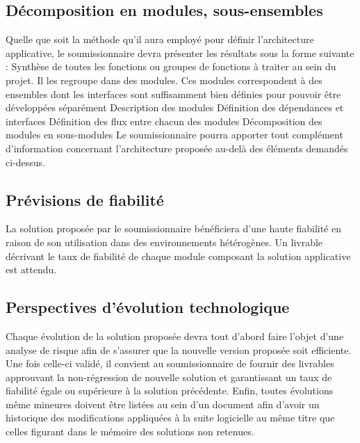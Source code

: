 \documentclass[11pt,fleqn]{book} %
\begin{document}
\subsection{Décomposition en modules, sous-ensembles}
Quelle que soit la méthode qu'il aura employé pour définir l'architecture applicative, le 
soumissionnaire devra présenter les résultats sous la forme suivante : 
Synthèse de toutes les fonctions ou groupes de fonctions à traiter au sein du projet. Il les regroupe dans des modules. Ces modules correspondent à des ensembles dont les interfaces sont suffisamment bien définies pour pouvoir être développées séparément
Description des modules
Définition des dépendances et interfaces
Définition des flux entre chacun des modules 
Décomposition des modules en sous-modules
Le soumissionnaire pourra apporter tout complément d'information concernant l'architecture proposée au-delà des éléments demandés ci-dessus. 

\subsection{Prévisions de fiabilité}
La solution proposée par le soumissionnaire bénéficiera d'une haute fiabilité en raison de son utilisation dans des environnements hétérogènes.
Un livrable décrivant le taux de fiabilité de chaque module composant la solution applicative est attendu.

\subsection{Perspectives d'évolution technologique}
Chaque évolution de la solution proposée devra tout d'abord faire l'objet d'une analyse de risque afin de s'assurer que la nouvelle version proposée soit efficiente.
Une fois celle-ci validé, il convient au soumissionnaire de fournir des livrables approuvant la non-régression de nouvelle solution et garantissant un taux de fiabilité égale ou supérieure à la solution précédente.
Enfin, toutes évolutions même mineures doivent être listées au sein d'un document afin d'avoir un historique des modifications appliquées à la suite logicielle au même titre que celles figurant dans le mémoire des solutions non retenues.


\end{document}
